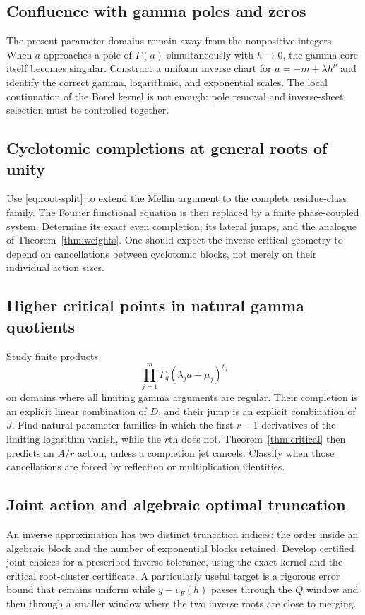 \documentclass[11pt,a4paper]{article}
\numberwithin{equation}{section}
\theoremstyle{definition}
\theoremstyle{remark}\newtheorem{remark}[theorem]{Remark}
\begin{document}
\subsection{Confluence with gamma poles and zeros}
The present parameter domains remain away from the nonpositive integers.
When $a$ approaches a pole of $\Gamma(a)$ simultaneously with $h\to0$,
the gamma core itself becomes singular. Construct a uniform inverse
chart for $a=-m+\lambda h^\nu$ and identify the correct gamma,
logarithmic, and exponential scales. The local continuation of the
Borel kernel is not enough: pole removal and inverse-sheet selection
must be controlled together.

\subsection{Cyclotomic completions at general roots of unity}
Use \eqref{eq:root-split} to extend the Mellin argument to the complete
residue-class family. The Fourier functional equation is then replaced
by a finite phase-coupled system. Determine its exact even completion,
its lateral jumps, and the analogue of Theorem~\ref{thm:weights}.
One should expect the inverse critical geometry to depend on cancellations
between cyclotomic blocks, not merely on their individual action sizes.

\subsection{Higher critical points in natural gamma quotients}
Study finite products
\[
 \prod_{j=1}^{m}\Gamma_q(\lambda_j a+\mu_j)^{r_j}
\]
on domains where all limiting gamma arguments are regular. Their
completion is an explicit linear combination of $D$, and their jump is
an explicit combination of $J$. Find natural parameter families in
which the first $r-1$ derivatives of the limiting logarithm vanish,
while the $r$th does not. Theorem~\ref{thm:critical} then predicts an
$A/r$ action, unless a completion jet cancels. Classify when those
cancellations are forced by reflection or multiplication identities.

\subsection{Joint action and algebraic optimal truncation}
An inverse approximation has two distinct truncation indices: the order
inside an algebraic block and the number of exponential blocks retained.
Develop certified joint choices for a prescribed inverse tolerance,
using the exact kernel and the critical root-cluster certificate.
A particularly useful target is a rigorous error bound that remains
uniform while $y-v_F(h)$ passes through the $Q$ window and then through
a smaller window where the two inverse roots are close to merging.
\end{document}
